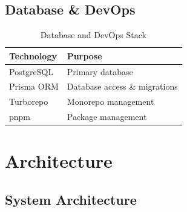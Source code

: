 \documentclass[12pt,a4paper]{article}
\begin{document}
\subsection{Database \& DevOps}

\begin{table}[H]
\centering
\begin{tabularx}{\textwidth}{|l|X|}
\hline
\textbf{Technology} & \textbf{Purpose} \\
\hline
PostgreSQL & Primary database \\
\hline
Prisma ORM & Database access \& migrations \\
\hline
Turborepo & Monorepo management \\
\hline
pnpm & Package management \\
\hline
\end{tabularx}
\caption{Database and DevOps Stack}
\end{table}

\section{Architecture}

\subsection{System Architecture}
\end{document}
